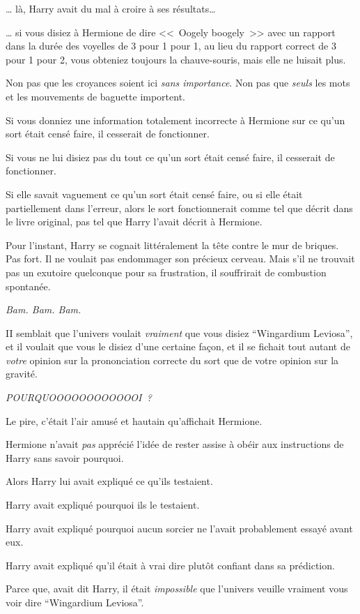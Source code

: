 … là, Harry avait du mal à croire à ses résultats…

… si vous disiez à Hermione de dire <<~Oogely boogely~>> avec un rapport dans la durée des voyelles de 3 pour 1 pour 1, au lieu du rapport correct de 3 pour 1 pour 2, vous obteniez toujours la chauve-souris, mais elle ne luisait plus.

Non pas que les croyances soient ici \emph{sans importance}. Non pas que \emph{seuls} les mots et les mouvements de baguette importent.

Si vous donniez une information totalement incorrecte à Hermione sur ce qu'un sort était censé faire, il cesserait de fonctionner.

Si vous ne lui disiez pas du tout ce qu'un sort était censé faire, il cesserait de fonctionner.

Si elle savait vaguement ce qu'un sort était censé faire, ou si elle était partiellement dans l'erreur, alors le sort fonctionnerait comme tel que décrit dans le livre original, pas tel que Harry l'avait décrit à Hermione.

Pour l'instant, Harry se cognait littéralement la tête contre le mur de briques. Pas fort. Il ne voulait pas endommager son précieux cerveau. Mais s'il ne trouvait pas un exutoire quelconque pour sa frustration, il souffrirait de combustion spontanée.

\emph{Bam. Bam. Bam.}

II semblait que l'univers voulait \emph{vraiment} que vous disiez “Wingardium Leviosa”, et il voulait que vous le disiez d'une certaine façon, et il se fichait tout autant de \emph{votre} opinion sur la prononciation correcte du sort que de votre opinion sur la gravité.

\emph{POURQUOOOOOOOOOOOOI~?}

Le pire, c'était l'air amusé et hautain qu'affichait Hermione.

Hermione n'avait \emph{pas} apprécié l'idée de rester assise à obéir aux instructions de Harry sans savoir pourquoi.

Alors Harry lui avait expliqué ce qu'ils testaient.

Harry avait expliqué pourquoi ils le testaient.

Harry avait expliqué pourquoi aucun sorcier ne l'avait probablement essayé avant eux.

Harry avait expliqué qu'il était à vrai dire plutôt confiant dans sa prédiction.

Parce que, avait dit Harry, il était \emph{impossible} que l'univers veuille vraiment vous voir dire “Wingardium Leviosa”.

